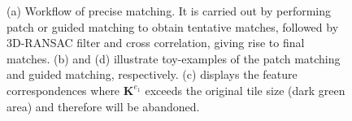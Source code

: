 \begin{figure}[htbp]
	\begin{center}
		\caption{(a) Workflow of precise matching. It is carried out by performing patch or guided matching to obtain tentative matches, followed by 3D-RANSAC filter and cross correlation, giving rise to final matches. (b) and (d) illustrate toy-examples of the patch matching and guided matching, respectively. (c) displays the feature correspondences where $\mathbf{K}^{e_1}$ exceeds the original tile size (dark green area) and therefore will be abandoned.}
		\label{WorkflowPatch}
	\end{center}
\end{figure}

